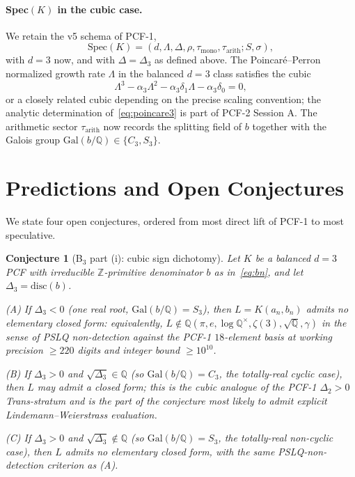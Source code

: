 \documentclass[11pt,a4paper]{article}
\newtheorem{conjecture}{Conjecture}
\theoremstyle{definition}
\theoremstyle{remark}
\newcommand{\Q}{\mathbb{Q}}
\newcommand{\Z}{\mathbb{Z}}
\newcommand{\disc}{\mathrm{disc}}
\newcommand{\Gal}{\mathrm{Gal}}
\newcommand{\Spec}{\mathrm{Spec}}
\begin{document}
\paragraph{Spec$(K)$ in the cubic case.}
We retain the v5 schema of PCF-1,
\[
\Spec(K)=(d,\Lambda,\Delta,\rho,\tau_{\mathrm{mono}},\tau_{\mathrm{arith}};S,\sigma),
\]
with $d=3$ now, and with $\Delta=\Delta_{3}$ as defined above. The
Poincar\'e--Perron normalized growth rate $\Lambda$ in the balanced
$d=3$ class satisfies the cubic
\begin{equation}\label{eq:poincare3}
\Lambda^{3}-\alpha_{3}\Lambda^{2}-\alpha_{3}\delta_{1}\Lambda-\alpha_{3}\delta_{0}=0,
\end{equation}
or a closely related cubic depending on the precise scaling
convention; the analytic determination of~\eqref{eq:poincare3} is part
of PCF-2 Session A. The arithmetic sector $\tau_{\mathrm{arith}}$ now
records the splitting field of $b$ together with the Galois group
$\Gal(b/\Q)\in\{C_{3},S_{3}\}$.

\section{Predictions and Open Conjectures}\label{sec:conjectures}

We state four open conjectures, ordered from most direct lift of PCF-1 to
most speculative.

\begin{conjecture}[B$_{3}$ part (i): cubic sign dichotomy]\label{conj:B1}
Let $K$ be a balanced $d=3$ PCF with irreducible $\Z$-primitive
denominator $b$ as in~\eqref{eq:bn}, and let $\Delta_{3}=\disc(b)$.

\emph{(A)} If $\Delta_{3}<0$ (one real root, $\Gal(b/\Q)=S_{3}$), then
$L=K(a_{n},b_{n})$ admits no elementary closed form: equivalently,
$L\notin\Q(\pi,e,\log\Q^{\times},\zeta(3),\sqrt{\Q},\gamma)$ in the sense
of PSLQ non-detection against the PCF-1 $18$-element basis at working
precision $\ge 220$ digits and integer bound $\ge 10^{10}$.

\emph{(B)} If $\Delta_{3}>0$ \emph{and} $\sqrt{\Delta_{3}}\in\Q$ (so
$\Gal(b/\Q)=C_{3}$, the totally-real cyclic case), then
$L$ \emph{may} admit a closed form; this is the cubic analogue of the
PCF-1 $\Delta_{2}>0$ Trans-stratum and is the part of the conjecture
most likely to admit explicit Lindemann--Weierstrass evaluation.

\emph{(C)} If $\Delta_{3}>0$ \emph{and} $\sqrt{\Delta_{3}}\notin\Q$ (so
$\Gal(b/\Q)=S_{3}$, the totally-real non-cyclic case), then $L$ admits no
elementary closed form, with the same PSLQ-non-detection criterion as
(A).
\end{conjecture}
\end{document}

